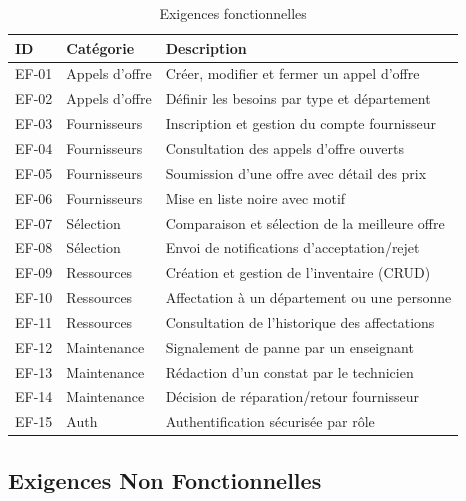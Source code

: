 \begin{table}[h!]
\centering
\begin{tabularx}{\textwidth}{|l|l|X|}
\hline
\textbf{ID} & \textbf{Catégorie} & \textbf{Description} \\
\hline
EF-01 & Appels d'offre & Créer, modifier et fermer un appel d'offre \\
\hline
EF-02 & Appels d'offre & Définir les besoins par type et département \\
\hline
EF-03 & Fournisseurs & Inscription et gestion du compte fournisseur \\
\hline
EF-04 & Fournisseurs & Consultation des appels d'offre ouverts \\
\hline
EF-05 & Fournisseurs & Soumission d'une offre avec détail des prix \\
\hline
EF-06 & Fournisseurs & Mise en liste noire avec motif \\
\hline
EF-07 & Sélection & Comparaison et sélection de la meilleure offre \\
\hline
EF-08 & Sélection & Envoi de notifications d'acceptation/rejet \\
\hline
EF-09 & Ressources & Création et gestion de l'inventaire (CRUD) \\
\hline
EF-10 & Ressources & Affectation à un département ou une personne \\
\hline
EF-11 & Ressources & Consultation de l'historique des affectations \\
\hline
EF-12 & Maintenance & Signalement de panne par un enseignant \\
\hline
EF-13 & Maintenance & Rédaction d'un constat par le technicien \\
\hline
EF-14 & Maintenance & Décision de réparation/retour fournisseur \\
\hline
EF-15 & Auth & Authentification sécurisée par rôle \\
\hline
\end{tabularx}
\caption{Exigences fonctionnelles}
\end{table}

\subsection{Exigences Non Fonctionnelles}

